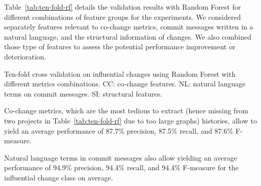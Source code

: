 Table~\ref{tab:ten-fold-rf} details the validation results with Random Forest for different combinations 
of feature groups for the experiments.
We considered separately features relevant to co-change metrics, commit messages written in a natural
language, and the structural information of changes. We
also combined those type of features to assess the potential performance
improvement or deterioration.

\begin{table}[h!]
    \caption{Ten-fold cross validation on influential changes using 
    Random Forest with different metrics combinations. 
    CC: co-change features. NL: natural language terms on commit messages.
    SI: structural features.}
    \label{tab:ten-fold-rf}
    
\end{table}

Co-change metrics, which are the most tedious to extract (hence missing from two projects in Table~\ref{tab:ten-fold-rf} due to too large graphs)
histories, allow to yield an average performance of 87.7\% precision, 
87.5\% recall, and 87.6\% F-measure.


Natural language terms in commit messages also allow yielding an average
performance of 94.9\% precision, 94.4\% recall, and 94.4\% F-measure
for the influential change class on average.


